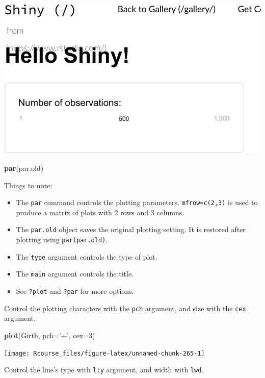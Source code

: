\documentclass[]{book}
\newenvironment{Shaded}{\begin{snugshade}}{\end{snugshade}}
\newcommand{\DataTypeTok}[1]{\textcolor[rgb]{0.13,0.29,0.53}{#1}}
\newcommand{\DecValTok}[1]{\textcolor[rgb]{0.00,0.00,0.81}{#1}}
\newcommand{\KeywordTok}[1]{\textcolor[rgb]{0.13,0.29,0.53}{\textbf{#1}}}
\newcommand{\NormalTok}[1]{#1}
\newcommand{\StringTok}[1]{\textcolor[rgb]{0.31,0.60,0.02}{#1}}
\providecommand{\tightlist}{%
  \setlength{\itemsep}{0pt}\setlength{\parskip}{0pt}}
\theoremstyle{definition}
\theoremstyle{definition}
\theoremstyle{definition}
\theoremstyle{remark}
\begin{document}
\includegraphics[width=0.5\linewidth]{Rcourse_files/figure-latex/unnamed-chunk-264-1}

\begin{Shaded}
\begin{Highlighting}[]
\KeywordTok{par}\NormalTok{(par.old)}
\end{Highlighting}
\end{Shaded}

Things to note:

\begin{itemize}
\tightlist
\item
  The \texttt{par} command controls the plotting parameters. \texttt{mfrow=c(2,3)} is used to produce a matrix of plots with 2 rows and 3 columns.
\item
  The \texttt{par.old} object saves the original plotting setting. It is restored after plotting using \texttt{par(par.old)}.
\item
  The \texttt{type} argument controls the type of plot.
\item
  The \texttt{main} argument controls the title.
\item
  See \texttt{?plot} and \texttt{?par} for more options.
\end{itemize}

Control the plotting characters with the \texttt{pch} argument, and size with the \texttt{cex} argument.

\begin{Shaded}
\begin{Highlighting}[]
\KeywordTok{plot}\NormalTok{(Girth, }\DataTypeTok{pch=}\StringTok{'+'}\NormalTok{, }\DataTypeTok{cex=}\DecValTok{3}\NormalTok{)}
\end{Highlighting}
\end{Shaded}

\texttt{[image: Rcourse\_files/figure-latex/unnamed-chunk-265-1]}

Control the line's type with \texttt{lty} argument, and width with \texttt{lwd}.
\end{document}
